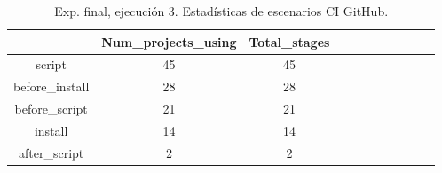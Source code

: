\begin{table}[h]
  \centering
  \caption{Exp. final, ejecución 3. Estadísticas de escenarios CI GitHub.}
  \label{tab:tabla_f3_5}

\begin{footnotesize}
\renewcommand{\arraystretch}{1.5} %
\begin{tabular}{ccccccccccc}
  \hline
  {} &  Num\_projects\_using &  Total\_stages \\
  \hline
  script         &                  45 &            45 \\
  before\_install &                  28 &            28 \\
  before\_script  &                  21 &            21 \\
  install        &                  14 &            14 \\
  after\_script   &                   2 &             2 \\
 \end{tabular}
\end{footnotesize}

\end{table}